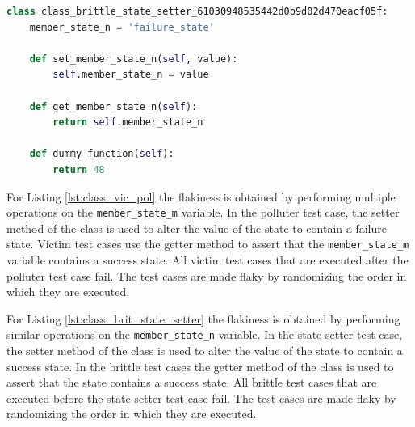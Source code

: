 \documentclass[
fancyheadings, %
%
%
]{stsreprt}
\begin{document}
\begin{lstlisting}[language=Python, caption={Class definition used in a flaky test from the brittle- and state-setter-pattern}, label=lst:class_brit_state_setter]
class class_brittle_state_setter_61030948535442d0b9d02d470eacf05f:
    member_state_n = 'failure_state'

    def set_member_state_n(self, value):
        self.member_state_n = value

    def get_member_state_n(self):
        return self.member_state_n

    def dummy_function(self):
        return 48
\end{lstlisting}
For Listing \ref{lst:class_vic_pol} the flakiness is obtained by performing multiple operations on the \newline \texttt{member\_state\_m} variable. 
In the polluter test case, the setter method of the class is used to alter the value of the state to contain a failure state.
Victim test cases use the getter method to assert that the \texttt{member\_state\_m} variable contains a success state. 
All victim test cases that are executed after the polluter test case fail.
The test cases are made flaky by randomizing the order in which they are executed. \par

For Listing \ref{lst:class_brit_state_setter} the flakiness is obtained by performing similar operations on the \texttt{member\_state\_n} variable. 
In the state-setter test case, the setter method of the class is used to alter the value of the state to contain a success state. 
In the brittle test cases the getter method of the class is used to assert that the state contains a success state. 
All brittle test cases that are executed before the state-setter test case fail. 
The test cases are made flaky by randomizing the order in which they are executed.
\end{document}
